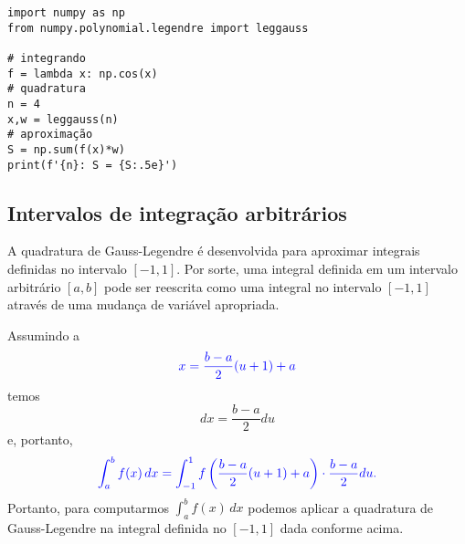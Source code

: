 \begin{ex}
\begin{lstlisting}
import numpy as np
from numpy.polynomial.legendre import leggauss

# integrando
f = lambda x: np.cos(x)
# quadratura
n = 4
x,w = leggauss(n)
# aproximação
S = np.sum(f(x)*w)
print(f'{n}: S = {S:.5e}')
\end{lstlisting}
\end{ex}

\subsection{Intervalos de integração arbitrários}

A quadratura de Gauss-Legendre é desenvolvida para aproximar integrais definidas no intervalo $[-1, 1]$. Por sorte, uma integral definida em um intervalo arbitrário $[a, b]$ pode ser reescrita como uma integral no intervalo $[-1, 1]$ através de uma mudança de variável apropriada.

Assumindo a 
\begin{equation}\color{blue}x = \frac{b-a}{2}(u+1)+a
\end{equation}
temos
\begin{equation}
  dx = \frac{b-a}{2}du
\end{equation}
e, portanto,
\begin{equation}\color{blue}\int_a^b f(x)\,dx = \int_{-1}^1 f\left(\frac{b-a}{2}(u+1)+a\right)\cdot \frac{b-a}{2}du.
\end{equation}
Portanto, para computarmos $\int_a^bf(x)\,dx$ podemos aplicar a quadratura de Gauss-Legendre na integral definida no $[-1, 1]$ dada conforme acima.

